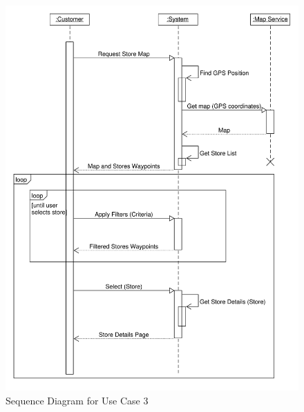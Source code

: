 \begin{figure}[H]
    \includegraphics[width=\textwidth]{Images/UML_Seq_Diag_3_2.pdf}
    \caption{\label{fig:Use_Case_Diag}Sequence Diagram for Use Case 3}
\end{figure}

